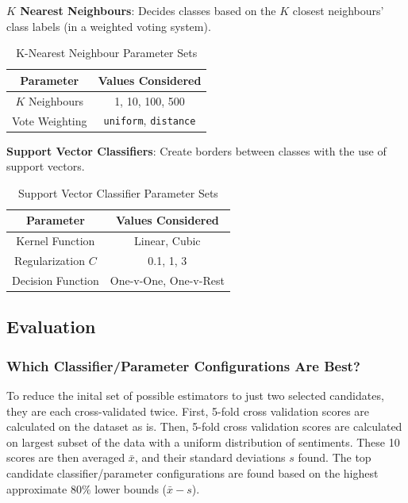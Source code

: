\documentclass[11pt]{article}
\begin{document}
\textbf{$K$ Nearest Neighbours}:
Decides classes based on the $K$ closest neighbours' class labels (in a weighted voting system). 
\begin{table}[!h]
	\begin{center}
		\begin{tabular}{|c|c|}			
			\hline
			Parameter & Values Considered \\
			\hline\hline
			$K$ Neighbours & 1, 10, 100, 500 \\
			Vote Weighting & \texttt{uniform}, \texttt{distance} \\
			\hline
		\end{tabular}
		\caption{K-Nearest Neighbour Parameter Sets}
		\label{tbl:knn-options}
	\end{center}
\end{table}

\textbf{Support Vector Classifiers}:
Create borders between classes with the use of support vectors. 
\begin{table}[!h]
	\begin{center}
		\begin{tabular}{|c|c|}			
			\hline
			Parameter & Values Considered \\
			\hline\hline
			Kernel Function & Linear, Cubic \\
			Regularization $C$ & 0.1, 1, 3 \\
			Decision Function & One-v-One, One-v-Rest \\
			\hline
		\end{tabular}
		\caption{Support Vector Classifier Parameter Sets}
		\label{tbl:svc-options}
	\end{center}
\end{table}


\subsection{Evaluation}\label{sec:evaluations}

\subsubsection{Which Classifier/Parameter Configurations Are Best?}\label{sec:choosing2}

To reduce the inital set of possible estimators to just two selected candidates,
they are each cross-validated twice. 
First, 5-fold cross validation scores are calculated on the dataset as is.
Then, 5-fold cross validation scores are calculated on largest subset of the data with a uniform distribution of sentiments.
These 10 scores are then averaged $\bar{x}$, and their standard deviations $s$ found. 
The top candidate classifier/parameter configurations are found based on the highest approximate $80\%$ lower bounds ($\bar{x} - s$).
\end{document}
